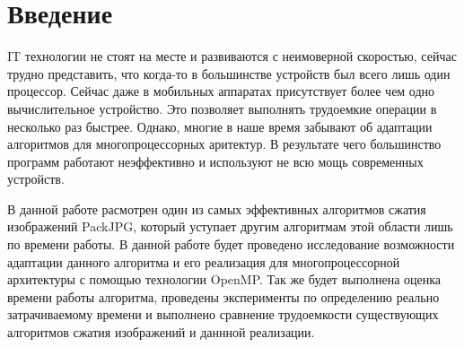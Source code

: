\documentclass{matmex-diploma-custom}
\begin{document}
\maketitle
\tableofcontents
\newpage
\section*{Введение}

    IT технологии не стоят на  месте и развиваются с неимоверной скоростью, сейчас трудно представить, что когда-то в большинстве устройств был всего лишь один процессор. Сейчас даже в мобильных аппаратах присутствует более чем одно вычислительное устройство. Это позволяет выполнять трудоемкие операции в несколько раз быстрее. Однако, многие в наше время забывают об адаптации алгоритмов для многопроцессорных аритектур. В результате чего большинство программ работают неэффективно и используют не всю мощь современных
  устройств.

 В данной работе расмотрен один из самых эффективных алгоритмов сжатия изображений PackJPG, который уступает другим алгоритмам этой области лишь по времени работы. В данной работе будет проведено исследование возможности адаптации данного алгоритма и его реализация для многопроцессорной архитектуры с помощью технологии OpenMP. Так же будет выполнена оценка времени работы алгоритма, проведены эксперименты по  определению реально затрачиваемому времени и выполнено сравнение трудоемкости существующих алгоритмов сжатия изображений и даннной реализации.
\end{document}
